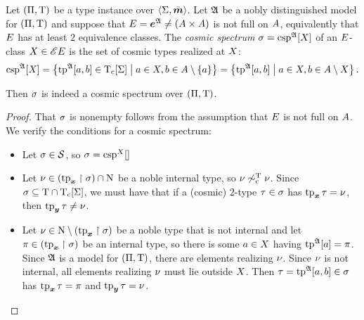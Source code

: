 \begin{definition}
Let $(\Pi,\mathrm{T})$ be a type instance over $\left\langle \mathrm{\Sigma},\bar{\bm{m}} \right\rangle$.
Let $\mathfrak{A}$ be a nobly distinguished model for $(\Pi,\mathrm{T})$ and suppose that
$E = \bm{e}^{\mathfrak{A}} \neq ({A\times A})$ is not full on $A$, equivalently that $E$ has at least
$2$ equivalence classes.
The \emph{cosmic spectrum} $\sigma = \operatorname{csp}^{\mathfrak{A}}[X]$ of an $E$-class
$X \in {\mathscr{E}E}$ is the set of cosmic types realized at $X$:
\[
  \operatorname{csp}^{\mathfrak{A}}[X] = \left\{\operatorname{tp}^{\mathfrak{A}}[a,b] \in \mathrm{T}_{\mathrm{c}}[\mathrm{\Sigma}]\mathrel{}\middle|\mathrel{}a\in X, b 
  \in A\setminus\left\{a\right\}\right\} = \left\{\operatorname{tp}^{\mathfrak{A}}[a,b]\mathrel{}\middle|\mathrel{}a \in X, b \in
  A \setminus X\right\}.
\]
\end{definition}
\begin{remark}
Then $\sigma$ is indeed a cosmic spectrum over $(\Pi,\mathrm{T})$.
\end{remark}
\begin{proof}
That $\sigma$ is nonempty follows from the assumption that $E$ is not full on
$A$. We verify the conditions for a cosmic spectrum:
\begin{itemize}
  \item[\refcondcspx] 
  Let $\sigma \in \mathcal{S}$, so $\csps = \cspIX\eclX$
  \item[\refcondcspnx]
   Let $\nu \in (\operatorname{tp}_{\bm{x}}\restriction\sigma) \cap \mathrm{\mathrm{N}}$ be a noble internal type,
   so $\nu \not\sim_{\mathrm{c}}^{\mathrm{T}} \nu$. Since $\sigma \subseteq \mathrm{T} \cap
   \mathrm{T}_{\mathrm{c}}[\mathrm{\Sigma}]$, we must have that if a (cosmic) $2$-type $\tau \in \sigma$ has
   $\operatorname{tp}_{\bm{x}}\tau = \nu$, then $\operatorname{tp}_{\bm{y}}\tau \neq \nu$.
   \item[\refcondcspny]
   Let $\nu \in \mathrm{\mathrm{N}} \setminus (\operatorname{tp}_{\bm{x}}\restriction\sigma)$ be a noble type that is not
   internal and let $\pi \in (\operatorname{tp}_{\bm{x}}\restriction\sigma)$ be an internal type, so
   there is some $a \in X$ having $\operatorname{tp}^{\mathfrak{A}}[a] = \pi$.
   Since $\mathfrak{A}$ is a model for $(\Pi,\mathrm{T})$, there are elements realizing
   $\nu$. Since $\nu$ is not internal, all elements realizing $\nu$ must
   lie outside $X$. Then $\tau = \operatorname{tp}^{\mathfrak{A}}[a,b] \in \sigma$ has
   $\operatorname{tp}_{\bm{x}}\tau = \pi$ and $\operatorname{tp}_{\bm{y}}\tau = \nu$.
\end{itemize}
\end{proof}

